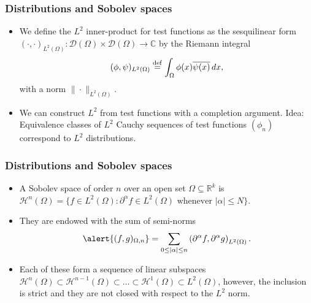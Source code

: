\documentclass[]{beamer}
\newcommand{\R}{\ensuremath{\mathbb R}}  %
\newcommand{\C}{\ensuremath{\mathbb C}}  %
\renewcommand{\C}{\ensuremath{\mathbb C}}  %
\newcommand{\HH}{\ensuremath{\mathscr H}} %
\newcommand{\DD}{\ensuremath{\mathscr D}}
\renewcommand{\bar}{\overline}
\newcommand{\eqdef}{\stackrel{\rm def}{=}}
\newcommand{\del}{\partial}
\begin{document}
\begin{frame}[t]
  \frametitle{Distributions and Sobolev spaces}
  \begin{itemize}
    \itemsep 1.2em
    \item We define the \alert{$L^2$ inner-product} for test functions as the sesquilinear form $(\cdot,\cdot)_{L^2(\Omega)}:\DD(\Omega)\times\DD(\Omega) \to \C$ by the Riemann integral
    $$
      (\phi,\psi)_{L^2(\Omega)} \eqdef \int_{\Omega} \phi(x)\bar{\psi(x)}\,dx,
    $$
    with a norm $\|\cdot \|_{L^2(\Omega)}$.
    \item We can construct $L^2$ from test functions with a completion argument. Idea: Equivalence classes of $L^2$ \alert{Cauchy sequences of test functions $(\phi_n)$} correspond to \alert{$L^2$ distributions}.
  \end{itemize}
\end{frame}

\begin{frame}[t]
  \frametitle{Distributions and Sobolev spaces}
  \begin{itemize}
    \itemsep 1.2em
    \item A \alert{Sobolev space} of order $n$ over an open set $\Omega \subseteq \R^k$ is $\HH^n(\Omega) = \{f \in L^2(\Omega): \del^\alpha f \in L^2(\Omega)\text{ whenever }|\alpha|\le N\}$.
    \item They are endowed with the sum of semi-norms
\begin{equation}
  \alert{(f,g)_{\Omega,n}} = \sum_{0\le |\alpha| \le n} \left( \del^\alpha f, \del^\alpha g\right)_{L^2(\Omega)}.
\end{equation}
    \item Each of these form a sequence of linear subspaces $\HH^n(\Omega) \subset \HH^{n-1}(\Omega) \subset \dots \subset \HH^1(\Omega) \subset L^2(\Omega)$, however, the inclusion is strict and they are not closed with respect to the $L^2$ norm.
  \end{itemize}
\end{frame}
\end{document}
